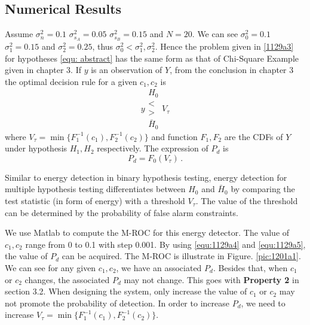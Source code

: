 \subsection{Numerical Results}
Assume $\sigma_n^2=0.1$ $\sigma_{s_A}^2=0.05$ $\sigma_{s_B}^2=0.15$ and $N=20$. We can see $\sigma_0^2=0.1$ $\sigma_1^2=0.15$ and $\sigma_2^2=0.25$, 
thus $\sigma_0^2 < \sigma_1^2, \sigma_2^2$. Hence the problem given in \eqref{1129a3} for hypotheses \eqref{equ: abstract} has the same form as that of Chi-Square Example given in chapter 3. 
If $y$ is an observation of $Y$, 
from the conclusion in chapter 3 the optimal  decision rule for a given $c_1, c_2$ is 
\begin{equation}
  y \substack{H_0 \\ < \\ > \\ \bar{H}_0} V_\tau
  \label{equ:1129a4}
\end{equation}
where $V_\tau = \min\{F_1^{-1}(c_1),  F_2^{-1}(c_2)\}$ and function $F_1,  F_2$ are the CDFs of $Y$ under hypothesis $H_1, H_2$ respectively. The expression of $P_d$ is 
\begin{equation}
  P_d = F_0(V_\tau)\,.
  \label{equ:1129a5}
\end{equation}

Similar to energy detection in binary hypothesis testing, energy detection for multiple hypothesis testing differentiates between $H_0$ and $\bar{H}_0$ by comparing the test statistic (in form of energy) with a threshold $V_\tau$. The value of the threshold can be determined by the probability of false alarm constraints.   

We use Matlab to compute the M-ROC for this energy detector. The value of $c_1, c_2$ range from 0 to 0.1 with step 0.001. By using \eqref{equ:1129a4} and \eqref{equ:1129a5}, the value of $P_d$ can be acquired. The M-ROC is illustrate in Figure. \ref{pic:1201a1}. We can see for any given $c_1, c_2$, we have an associated $P_d$. Besides that, when $c_1$ or $c_2$ changes, the associated $P_d$ may not change. This goes with \textbf{Property 2} in section 3.2. When designing the system, only increase the value of $c_1$ or $c_2$ may not promote the probability of detection. In order to increase $P_d$, we need to increase $V_\tau = \min\{F_1^{-1}(c_1),  F_2^{-1}(c_2)\}$. 

